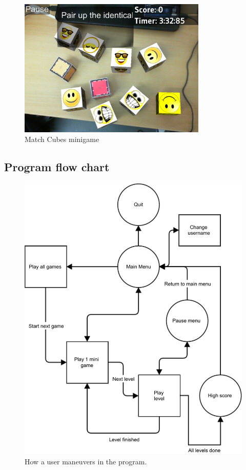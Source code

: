 \begin{figure}[ht]
	\capstart
	\centering
	\includegraphics[width=0.8\textwidth]{images/MatchCubes}
	\caption{Match Cubes minigame}
	\label{fig:match_cubes}
\end{figure}


\subsection{Program flow chart}

\begin{figure}[ht]
	\capstart
	\includegraphics[width=\textwidth]{images/user_flow_chart}
	\caption[Program flow chart]{How a user maneuvers in the program.}
	\label{fig:program_flow_chart}
\end{figure}

